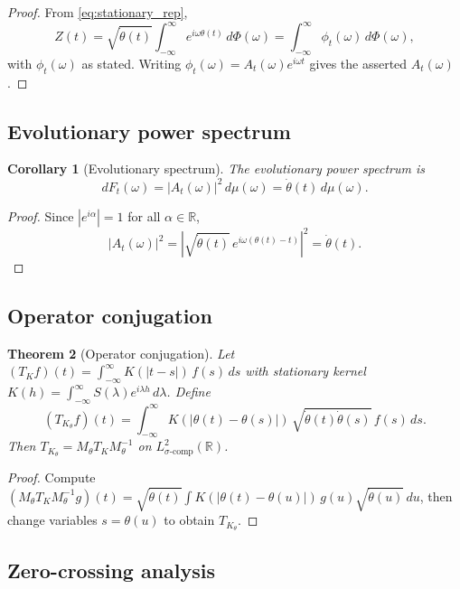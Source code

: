 \documentclass{article}
\newtheorem{theorem}{Theorem}[section]
\newtheorem{corollary}[theorem]{Corollary}
\begin{document}
\begin{proof}
From \eqref{eq:stationary_rep},
\[
Z(t)=\sqrt{\dot{\theta}(t)}\int_{-\infty}^{\infty} e^{i\omega \theta(t)}\, d\Phi(\omega)
=\int_{-\infty}^{\infty} \phi_t(\omega)\, d\Phi(\omega),
\]
with $\phi_t(\omega)$ as stated. Writing $\phi_t(\omega)=A_t(\omega)e^{i\omega t}$ gives the asserted $A_t(\omega)$.
\end{proof}

\subsection{Evolutionary power spectrum}

\begin{corollary}[Evolutionary spectrum]\label{cor:evolving_spec}
The evolutionary power spectrum is
\[
dF_t(\omega)=|A_t(\omega)|^2\, d\mu(\omega)=\dot{\theta}(t)\, d\mu(\omega).
\]
\end{corollary}

\begin{proof}
Since $|e^{i\alpha}|=1$ for all $\alpha\in\mathbb{R}$,
\[
|A_t(\omega)|^2=\left|\sqrt{\dot{\theta}(t)}\, e^{i\omega(\theta(t)-t)}\right|^2=\dot{\theta}(t).
\]
\end{proof}

\subsection{Operator conjugation}

\begin{theorem}[Operator conjugation]\label{thm:operator_conjugation}
Let $(T_K f)(t)=\int_{-\infty}^{\infty} K(|t-s|)\, f(s)\, ds$ with stationary kernel $K(h)=\int_{-\infty}^{\infty} S(\lambda) e^{i\lambda h}\, d\lambda$. Define
\[
(T_{K_\theta} f)(t)=\int_{-\infty}^{\infty} K(|\theta(t)-\theta(s)|)\, \sqrt{\dot{\theta}(t)\dot{\theta}(s)}\, f(s)\, ds.
\]
Then $T_{K_\theta}=M_\theta T_K M_\theta^{-1}$ on $L^2_{\sigma\text{-comp}}(\mathbb{R})$.
\end{theorem}

\begin{proof}
Compute $(M_\theta T_K M_\theta^{-1}g)(t)=\sqrt{\dot{\theta}(t)}\int K(|\theta(t)-\theta(u)|)\, g(u)\sqrt{\dot{\theta}(u)}\, du$, then change variables $s=\theta(u)$ to obtain $T_{K_\theta}$.
\end{proof}

\subsection{Zero-crossing analysis}
\end{document}

